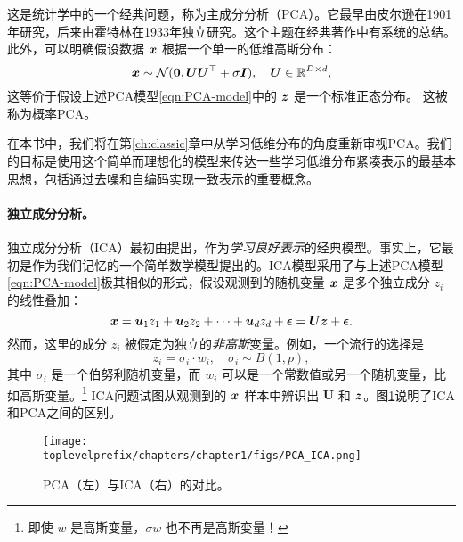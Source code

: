 \documentclass[../../book-main_zh.tex]{subfiles}
\begin{document}
这是统计学中的一个经典问题，称为主成分分析（PCA）。它最早由皮尔逊在1901年研究\cite{Pearson1901}，后来由霍特林在1933年独立研究\cite{Hotelling1933}。这个主题在经典著作\cite{Jolliffe1986,JolliffeI2002}中有系统的总结。
此外，可以明确假设数据 $\bm{x}$ 根据一个单一的低维高斯分布：
\begin{equation}
    \bm{x} \sim \mathcal{N}(\boldsymbol{0}, \boldsymbol{U}\boldsymbol{U}^\top + \sigma \bm{I}), \quad \boldsymbol{U} \in \mathbb{R}^{D\times d},
\end{equation}
这等价于假设上述PCA模型\eqref{eqn:PCA-model}中的 $\bm{z}$ 是一个标准正态分布。
这被称为概率PCA\cite{TippingM1999}。

在本书中，我们将在第\ref{ch:classic}章中从学习低维分布的角度重新审视PCA。我们的目标是使用这个简单而理想化的模型来传达一些学习低维分布紧凑表示的最基本思想，包括通过去噪和自编码实现一致表示的重要概念。

\paragraph{独立成分分析。}
独立成分分析（ICA）最初由\cite{Ans-1985}提出，作为{\em 学习良好表示}的经典模型。事实上，它最初是作为我们记忆的一个简单数学模型提出的。ICA模型采用了与上述PCA模型\eqref{eqn:PCA-model}极其相似的形式，假设观测到的随机变量 $\bm{x}$ 是多个独立成分 $z_i$ 的线性叠加：
\begin{equation}
    \bm{x} = \boldsymbol{u}_1 z_1 + \boldsymbol{u}_2 z_2 + \cdots + \boldsymbol{u}_d z_d  + \boldsymbol{\epsilon} =  \boldsymbol{U} \bm{z} + \boldsymbol{\epsilon}.
    \label{eqn:ICA-model}
\end{equation}
然而，这里的成分 $z_i$ 被假定为独立的{\em 非高斯}变量。例如，一个流行的选择是
\begin{equation}
    z_i = \sigma_i \cdot w_i, \quad \sigma_i \sim B(1,p),
    \label{eqn:ICA-modes}
\end{equation}
其中 $\sigma_i$ 是一个伯努利随机变量，而 $w_i$ 可以是一个常数值或另一个随机变量，比如高斯变量。\footnote{即使 $w$ 是高斯变量，$\sigma w$ 也不再是高斯变量！} ICA问题试图从观测到的 $\bm{x}$ 样本中辨识出 $\boldsymbol{U}$ 和 $\bm{z}$。图\ref{fig:ICA-PCA}说明了ICA和PCA之间的区别。

\begin{figure}
    \centering
    \texttt{[image: \\toplevelprefix/chapters/chapter1/figs/PCA\_ICA.png]}
    \caption{PCA（左）与ICA（右）的对比。}
    \label{fig:ICA-PCA}
\end{figure}
\end{document}
